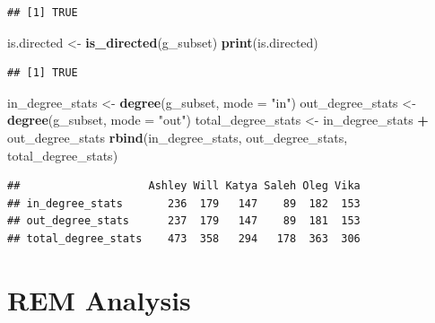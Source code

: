 \documentclass[
]{article}
\newenvironment{Shaded}{\begin{snugshade}}{\end{snugshade}}
\newcommand{\AttributeTok}[1]{\textcolor[rgb]{0.13,0.29,0.53}{#1}}
\newcommand{\FunctionTok}[1]{\textcolor[rgb]{0.13,0.29,0.53}{\textbf{#1}}}
\newcommand{\NormalTok}[1]{#1}
\newcommand{\OtherTok}[1]{\textcolor[rgb]{0.56,0.35,0.01}{#1}}
\newcommand{\SpecialCharTok}[1]{\textcolor[rgb]{0.81,0.36,0.00}{\textbf{#1}}}
\newcommand{\StringTok}[1]{\textcolor[rgb]{0.31,0.60,0.02}{#1}}
\begin{document}
\begin{verbatim}
## [1] TRUE
\end{verbatim}

\begin{Shaded}
\begin{Highlighting}[]
\NormalTok{is.directed }\OtherTok{\textless{}{-}} \FunctionTok{is\_directed}\NormalTok{(g\_subset)}
\FunctionTok{print}\NormalTok{(is.directed)}
\end{Highlighting}
\end{Shaded}

\begin{verbatim}
## [1] TRUE
\end{verbatim}

\begin{Shaded}
\begin{Highlighting}[]
\NormalTok{in\_degree\_stats }\OtherTok{\textless{}{-}} \FunctionTok{degree}\NormalTok{(g\_subset, }\AttributeTok{mode =} \StringTok{"in"}\NormalTok{)}
\NormalTok{out\_degree\_stats }\OtherTok{\textless{}{-}} \FunctionTok{degree}\NormalTok{(g\_subset, }\AttributeTok{mode =} \StringTok{"out"}\NormalTok{)}
\NormalTok{total\_degree\_stats }\OtherTok{\textless{}{-}}\NormalTok{ in\_degree\_stats }\SpecialCharTok{+}\NormalTok{ out\_degree\_stats}
\FunctionTok{rbind}\NormalTok{(in\_degree\_stats, out\_degree\_stats, total\_degree\_stats)}
\end{Highlighting}
\end{Shaded}

\begin{verbatim}
##                    Ashley Will Katya Saleh Oleg Vika
## in_degree_stats       236  179   147    89  182  153
## out_degree_stats      237  179   147    89  181  153
## total_degree_stats    473  358   294   178  363  306
\end{verbatim}

\hypertarget{rem-analysis}{%
\section{REM Analysis}\label{rem-analysis}}
\end{document}
